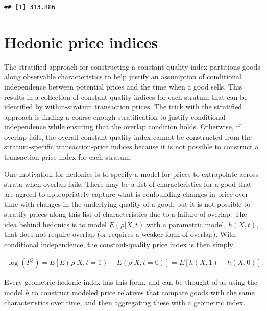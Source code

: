 \documentclass[]{article}
\begin{document}
\begin{verbatim}
## [1] 313.886
\end{verbatim}

\hypertarget{hedonic-price-indices}{%
\section{Hedonic price indices}\label{hedonic-price-indices}}

The stratified approach for constructing a constant-quality index partitions goods along observable characteristics to help justify an assumption of conditional independence between potential prices and the time when a good sells. This results in a collection of constant-quality indices for each stratum that can be identified by within-stratum transaction prices. The trick with the stratified approach is finding a coarse enough stratification to justify conditional independence while ensuring that the overlap condition holds. Otherwise, if overlap fails, the overall constant-quality index cannot be constructed from the stratum-specific transaction-price indices because it is not possible to construct a transaction-price index for each stratum.

One motivation for hedonics is to specify a model for prices to extrapolate across strata when overlap fails. There may be a list of characteristics for a good that are agreed to appropriately capture what is confounding changes in price over time with changes in the underlying quality of a good, but it is not possible to stratify prices along this list of characteristics due to a failure of overlap. The idea behind hedonics is to model \(E(\rho | X, t)\) with a parametric model, \(h(X, t)\), that does not require overlap (or requires a weaker form of overlap). With conditional independence, the constant-quality price index is then simply

\begin{align*}
\log(I^{Q}) = E[E(\rho | X, t = 1) - E(\rho | X, t = 0)] = E[h(X, 1) - h(X, 0)].
\end{align*}

Every geometric hedonic index has this form, and can be thought of as using the model \(h\) to construct modeled price relatives that compare goods with the same characteristics over time, and then aggregating these with a geometric index.
\end{document}
